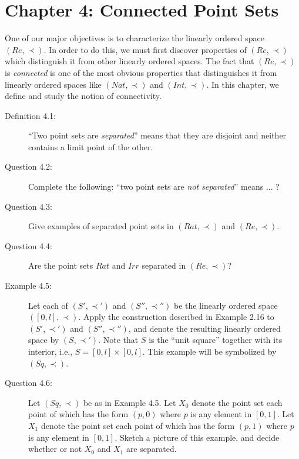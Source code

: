 \documentclass{book}
\begin{document}
\chapter*{Chapter 4: Connected Point Sets}


One of our major objectives is to characterize the linearly ordered space $(Re, \prec)$. In order to do this, we must first discover properties of $(Re, \prec)$ which distinguish it from other linearly ordered spaces. The fact that $(Re, \prec)$ is \emph{connected} is one of the most obvious properties that distinguishes it from linearly ordered spaces like $(Nat, \prec)$ and $(Int, \prec)$. In this chapter, we define and study the notion of connectivity.

\begin{description}

\item[Definition 4.1:] ``Two point sets are \emph{separated}'' means that they are disjoint and neither contains a limit point of the other.

\item[Question 4.2:] Complete the following: ``two point sets are \emph{not separated}'' means ... ?

\item[Question 4.3:] Give examples of separated point sets in $(Rat, \prec)$ and $(Re, \prec)$.

\item[Question 4.4:] Are the point sets $Rat$ and $Irr$ separated in $(Re, \prec)$?

\item[Example 4.5:] Let each of $(S', \prec ')$ and $(S'', \prec '')$ be the linearly ordered space $([0,l], \prec)$. Apply the construction described in Example 2.16 to $(S', \prec ')$ and $(S'', \prec '')$, and denote the resulting linearly ordered space by $(S, \prec ')$. Note that $S$ is the ``unit square'' together with its interior, i.e., $S = [0,l] \times [0,l]$. This example will be symbolized by $(Sq, \prec)$.

\item[Question 4.6:] Let $(Sq, \prec)$ be as in Example 4.5. Let $X_{0}$ denote the point set each point of which has the form $(p,0)$ where $p$ is any element in $[0,1]$. Let $X_{1}$ denote the point set each point of which has the form $(p,1)$ where $p$ is any element in $[0,1]$. Sketch a picture of this example, and decide whether or not $X_{0}$ and $X_{1}$ are separated.


\end{description}
\end{document}
